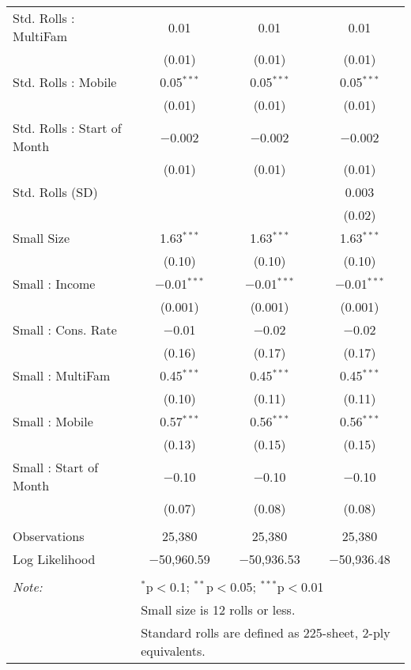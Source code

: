 \begin{table}[!htbp]
\begin{tabular}{@{\extracolsep{5pt}}lccc}
  Std. Rolls : MultiFam & 0.01 & 0.01 & 0.01 \\ 
  & (0.01) & (0.01) & (0.01) \\ 
  Std. Rolls : Mobile & 0.05$^{***}$ & 0.05$^{***}$ & 0.05$^{***}$ \\ 
  & (0.01) & (0.01) & (0.01) \\ 
  Std. Rolls : Start of Month & $-$0.002 & $-$0.002 & $-$0.002 \\ 
  & (0.01) & (0.01) & (0.01) \\ 
  Std. Rolls (SD) &  &  & 0.003 \\ 
  &  &  & (0.02) \\ 
  Small Size & 1.63$^{***}$ & 1.63$^{***}$ & 1.63$^{***}$ \\ 
  & (0.10) & (0.10) & (0.10) \\ 
  Small : Income & $-$0.01$^{***}$ & $-$0.01$^{***}$ & $-$0.01$^{***}$ \\ 
  & (0.001) & (0.001) & (0.001) \\ 
  Small : Cons. Rate & $-$0.01 & $-$0.02 & $-$0.02 \\ 
  & (0.16) & (0.17) & (0.17) \\ 
  Small : MultiFam & 0.45$^{***}$ & 0.45$^{***}$ & 0.45$^{***}$ \\ 
  & (0.10) & (0.11) & (0.11) \\ 
  Small : Mobile & 0.57$^{***}$ & 0.56$^{***}$ & 0.56$^{***}$ \\ 
  & (0.13) & (0.15) & (0.15) \\ 
  Small : Start of Month & $-$0.10 & $-$0.10 & $-$0.10 \\ 
  & (0.07) & (0.08) & (0.08) \\ 
 \hline \\[-1.8ex] 
Observations & 25,380 & 25,380 & 25,380 \\ 
Log Likelihood & $-$50,960.59 & $-$50,936.53 & $-$50,936.48 \\ 
\hline 
\hline \\[-1.8ex] 
\textit{Note:}  & \multicolumn{3}{l}{$^{*}$p$<$0.1; $^{**}$p$<$0.05; $^{***}$p$<$0.01} \\ 
 & \multicolumn{3}{l}{Small size is 12 rolls or less.} \\ 
 & \multicolumn{3}{l}{Standard rolls are defined as 225-sheet, 2-ply equivalents.} \\ 
\end{tabular} 
\end{table} 
